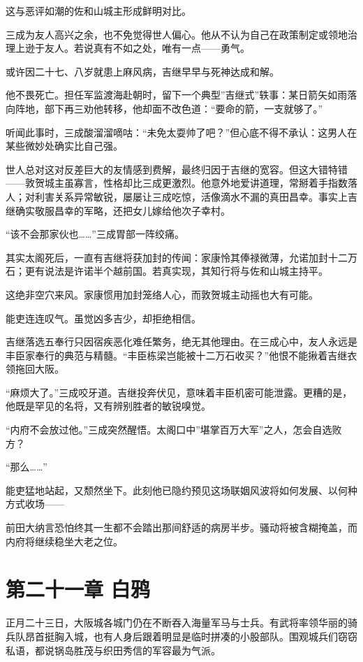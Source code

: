 \documentclass[
]{book}
\begin{document}
这与恶评如潮的佐和山城主形成鲜明对比。

三成为友人高兴之余，也不免觉得世人偏心。他从不认为自己在政策制定或领地治理上逊于友人。若说真有不如之处，唯有一点------勇气。

或许因二十七、八岁就患上麻风病，吉继早早与死神达成和解。

他不畏死亡。担任军监渡海赴朝时，留下一个典型''吉继式''轶事：某日箭矢如雨落向阵地，部下再三劝他转移，他却面不改色道：``要命的箭，一支就够了。''

听闻此事时，三成酸溜溜嘀咕：``未免太耍帅了吧？''但心底不得不承认：这男人在某些微妙处确实比自己强。

世人总对这对反差巨大的友情感到费解，最终归因于吉继的宽容。但这大错特错------敦贺城主虽寡言，性格却比三成更激烈。他意外地爱讲道理，常掰着手指数落人；对利害关系异常敏锐，屡屡让三成吃惊，活像滴水不漏的真田昌幸。事实上吉继确实敬服昌幸的军略，还把女儿嫁给他次子幸村。

``该不会那家伙也\ldots\ldots{}''三成胃部一阵绞痛。

其实太阁死后，一直有吉继将获加封的传闻：家康怜其俸禄微薄，允诺加封十二万石；更有说法是许诺半个越前国。若真实现，其知行将与佐和山城主持平。

这绝非空穴来风。家康惯用加封笼络人心，而敦贺城主动摇也大有可能。

能吏连连叹气。虽觉凶多吉少，却拒绝相信。

吉继落选五奉行只因宿疾恶化难任繁务，绝无其他理由。在三成心中，友人永远是丰臣家奉行的典范与精髓。``丰臣栋梁岂能被十二万石收买？''他恨不能揪着吉继衣领拖回大阪。

``麻烦大了。''三成咬牙道。吉继投奔伏见，意味着丰臣机密可能泄露。更糟的是，他既是罕见的名将，又有辨别胜者的敏锐嗅觉。

``内府不会放过他。''三成突然醒悟。太阁口中''堪掌百万大军''之人，怎会自选败方？

``那么\ldots\ldots{}''

能吏猛地站起，又颓然坐下。此刻他已隐约预见这场联姻风波将如何发展、以何种方式收场------

前田大纳言恐怕终其一生都不会踏出那间舒适的病房半步。骚动将被含糊掩盖，而内府将继续稳坐大老之位。

\chapter*{第二十一章 白鸦}\label{ux7b2cux4e8cux5341ux4e00ux7ae0-ux767dux9e26}

正月二十三日，大阪城各城门仍在不断吞入海量军马与士兵。有武将率领华丽的骑兵队昂首挺胸入城，也有人身后跟着明显是临时拼凑的小股部队。围观城兵们窃窃私语，都说锅岛胜茂与织田秀信的军容最为气派。
\end{document}
